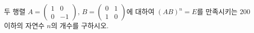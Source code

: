 \hspace*{2mm}\begin{minipage}[t]{\dimexpr\linewidth-2mm\relax}\vspace{0pt}
두 행렬 $A=\begin{pmatrix} 1 & 0 \\ 0 & -1 \end{pmatrix}$, $B=\begin{pmatrix} 0 & 1 \\ 1 & 0 \end{pmatrix}$에 대하여 $(AB)^n=E$를 만족시키는 $200$ 이하의 자연수 $n$의 개수를 구하시오. \end{minipage}
